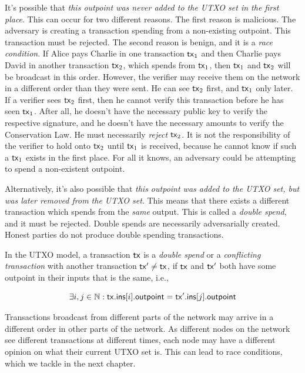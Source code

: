 It's possible that \emph{this outpoint was never added to the UTXO set in the first place}.
This can occur for two different reasons.
The first reason is malicious. The adversary is creating a transaction spending from
a non-existing outpoint. This transaction must be rejected.
The second reason is benign, and it is a \emph{race condition}.
If Alice pays Charlie in one transaction $\mathsf{tx}_1$ and then Charlie pays David in another
transaction $\mathsf{tx}_2$, which spends from $\mathsf{tx}_1$, then $\mathsf{tx}_1$ and $\mathsf{tx}_2$ will be broadcast
in this order. However, the verifier may receive them on the network
in a different order than they were sent. He can see $\mathsf{tx}_2$ first, and $\mathsf{tx}_1$ only later.
If a verifier sees $\mathsf{tx}_2$ first, then
he cannot verify this transaction before he has seen $\mathsf{tx}_1$. After all, he doesn't have
the necessary public key to verify the respective signature, and he doesn't have the
necessary amounts to verify the Conservation Law.
He must necessarily \emph{reject}
$\mathsf{tx}_2$. It is not
the responsibility of the verifier to hold onto $\mathsf{tx}_2$ until $\mathsf{tx}_1$ is received,
because he cannot know if such a $\mathsf{tx}_1$ exists in the first place. For all it knows,
an adversary could be attempting to spend a non-existent outpoint.

Alternatively, it's also possible that \emph{this outpoint was added to the UTXO set, but was later
removed from the UTXO set}. This means that there exists a different transaction
which spends from the \emph{same} output. This is called a \emph{double spend},
and it must be rejected. Double spends are necessarily adversarially created.
Honest parties do not produce double spending transactions.

\begin{definition}
  In the UTXO model, a transaction $\mathsf{tx}$ is a \emph{double spend} or a
  \emph{conflicting transaction} with another transaction $\mathsf{tx}' \neq \mathsf{tx}$,
  if $\mathsf{tx}$ and $\mathsf{tx}'$ both have some outpoint in their inputs that is the
  same, i.e.,

  \[
    \exists i, j \in \mathbb{N}: \mathsf{tx}\textsf{.ins}[i]\textsf{.outpoint} = \mathsf{tx}'\textsf{.ins}[j]\textsf{.outpoint}
  \]
\end{definition}

Transactions broadcast from different parts of the network may arrive in a different order in other
parts of the network.
As different nodes on the network see different transactions
at different times, each node may have a different opinion on what their current UTXO set is.
This can lead to race conditions, which we tackle in the next chapter.

